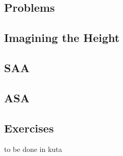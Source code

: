 \subsection{Problems}
\noindent{}
\newpage
\subsection{Imagining the Height}
\subsection{SAA}
\subsection{ASA}
\newpage
\subsection{Exercises}
to be done in kuta

